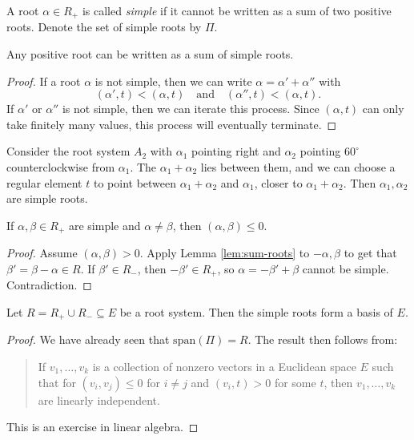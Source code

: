 \begin{definition}
  A root $\alpha \in R_+$ is called
  \emph{simple} if it cannot be written
  as a sum of two positive roots. Denote
  the set of simple roots by $\Pi$.
\end{definition}

\begin{lemma}
  Any positive root can be written as a
  sum of simple roots.
\end{lemma}

\begin{proof}
  If a root $\alpha$ is not simple, then
  we can write $\alpha = \alpha' + \alpha''$
  with
  \[
    (\alpha', t) < (\alpha, t)
    \quad\text{and}\quad
    (\alpha'', t) < (\alpha, t).
  \]
  If $\alpha'$ or $\alpha''$ is not simple,
  then we can iterate this process.
  Since $(\alpha, t)$ can only take
  finitely many values,
  this process will eventually terminate.
\end{proof}

\begin{example}
  Consider the root system $A_2$
  with $\alpha_1$ pointing right and
  $\alpha_2$ pointing $60^\circ$
  counterclockwise from $\alpha_1$.
  The $\alpha_1 + \alpha_2$ lies between
  them, and we can choose a regular element
  $t$ to point between
  $\alpha_1 + \alpha_2$ and $\alpha_1$,
  closer to $\alpha_1 + \alpha_2$.
  Then $\alpha_1, \alpha_2$ are simple
  roots.
\end{example}

\begin{lemma}
  If $\alpha, \beta \in R_+$ are simple and
  $\alpha \ne \beta$, then
  $(\alpha, \beta) \le 0$.
\end{lemma}

\begin{proof}
  Assume $(\alpha, \beta) > 0$. Apply
  Lemma \ref{lem:sum-roots} to
  $-\alpha, \beta$ to get that
  $\beta' = \beta - \alpha \in R$.
  If $\beta' \in R_-$, then
  $-\beta' \in R_+$, so
  $\alpha = -\beta' + \beta$ cannot
  be simple. Contradiction.
\end{proof}

\begin{theorem}
  Let $R = R_+ \cup R_- \subseteq E$ be a
  root system. Then the simple roots
  form a basis of $E$.
\end{theorem}

\begin{proof}
  We have already seen that
  $\mathrm{span}(\Pi) = R$. The result
  then follows from:
  \begin{quote}
    \vspace{-2em}
    \begin{lemma}
      If $v_1, \dots, v_k$ is a collection
      of nonzero vectors in a Euclidean
      space $E$ such that for
      $(v_i, v_j) \le 0$ for
      $i \ne j$ and
      $(v_i, t) > 0$ for some $t$,
      then $v_1, \dots, v_k$ are
      linearly independent.
    \end{lemma}
  \end{quote}
  This is an exercise in linear algebra.
\end{proof}


